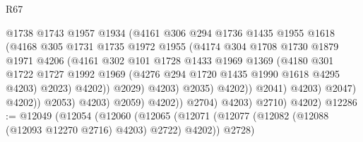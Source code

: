 \begin{lexlean}{R67}
\begin{coremodule}
                                      @1738
                                      @1743
                                      @1957
                                      @1934
                                      (@4161
                                        @306
                                        @294
                                        @1736
                                        @1435
                                        @1955
                                        @1618
                                        (@4168
                                          @305
                                          @1731
                                          @1735
                                          @1972
                                          @1955
                                          (@4174
                                            @304
                                            @1708
                                            @1730
                                            @1879
                                            @1971
                                            @4206
                                            (@4161
                                              @302
                                              @101
                                              @1728
                                              @1433
                                              @1969
                                              @1369
                                              (@4180
                                                @301
                                                @1722
                                                @1727
                                                @1992
                                                @1969
                                                (@4276 @294 @1720 @1435 @1990 @1618 @4295 @4203)
                                                @2023)
                                              @4202))
                                          @2029)
                                        @4203)
                                      @2035)
                                    @4202))
                                @2041)
                              @4203)
                            @2047)
                          @4202))
                      @2053)
                    @4203)
                  @2059)
                @4202))
            @2704)
          @4203)
        @2710)
      @4202)
@12286 := @12049
    (@12054
      (@12060
        (@12065 (@12071 (@12077 (@12082 (@12088 (@12093 @12270 @2716) @4203) @2722) @4202)) @2728)

\end{coremodule}
\end{lexlean}
